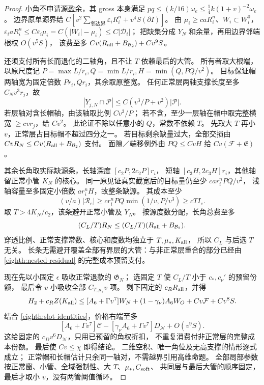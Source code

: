\begin{proof}
小角不申请源盈余，其 gross 本身满足
\(pq\le(k/16)\omega_e\le\tfrac14 k(1+v)^{-2}\omega_e\)。
边界原单源界给
\(C[v^2\sum_{\text{邻边界}}\varepsilon_iR_i^n+v^4S(\partial I)]\)。
由 \(\mu_i\ge c aR_i^n\)、\(W_i\subset W_i^0\)，
\(\varepsilon_i aR_i^n\le C\varepsilon_i\mu_i
=C(|W_i|-\mu_i)\le C|\mathscr D_i|\)；
把缺集分成 \(Y_N\) 和余量，再用边界邻端根权 \(O(v^5S)\)，
该费至多 \(Cv(R_{\rm all}+B_{\mathcal B_2})+Cv^9S\)。

还须支付所有长而退化的二轴角，且不让 \(T\) 依赖最后的大管。
所有者取大根端，以原尺度记
\(P=\max L/r_i,Q=\min L/r_i,H=\min(Q,PQ/v^2)\)。
目标保证帽两轴宽为固定倍数 \(Pr_i,Qr_i\)，其余取原整宽。
任何正常层两轴支撑长度至多 \(C_Nv^3r_j\)，故
\begin{equation}\label{eighth:long-cap-fraction}
 |Y_{j,N}\cap\mathcal P|
 \le C(v^3/P+v^2)|\mathcal P|.
\end{equation}
若层轴对含长帽轴，由该轴取比例 \(Cv^3/P\)；
若不含，至少一层轴在帽中取完整横宽 \(\ge cvr_j\)，给 \(Cv^2\)。
此论证不除以任意小的 \(Q\)，常数不依赖 \(T\)。
先取大 \(T\) 再小 \(v\)，正常层占目标帽不超过四分之一。
若目标剩余缺量过大，全部交损由
\(CvR_N\le Cv(R_{\rm all}+B_{\mathcal B_2})\) 支付。
面隙／端移例外由 \(PQ\le CvH\) 给 \(Cv(\mathcal F+\mathfrak E)\)。

其余长角取实际缺源条，长轴深度 \([c_2P,2c_2P]r_i\)，
短轴 \([c_3H,2c_3H]r_i\)，其他轴留正常小管 \(K_N\) 的核心。
同一原见证真实截宽后的目标量仍至少 \(car_i^nPQ/v^2\)，
浅轴容量至多固定小倍数 \(ar_i^nH\)，故整条缺源。
其成本至少
\[
 (v/a)|\mathcal R_e|\ge
 cr_i^nPQ\min(1/v,P/v^3)\ge cT I_e .
\]
取 \(T>4K_N/c_2\)，该条避开正常小管及 \(Y_N\)。
按源度数分配，长角总费至多
\begin{equation}\label{eighth:two-tubes}
 (C_L/T)R_N\le(C_L/T)(R_{\rm all}+B_{\mathcal B_2}).
\end{equation}
穿透比例、正常支撑常数、核心和度数均独立于 \(T,\mu_*,K_{\rm all}\)，
所以 \(C_L\) 与后选 \(T\) 无关。
长条无需避开覆盖全部有界层的大管：与非正常层重合的部分已经由
\eqref{eighth:nested-residual} 的完整成本预留支付。

现在先以小固定 \(\epsilon\) 吸收正常退款的 \(\mathfrak G_N\)；
选固定 \(T\) 使 \(C_L/T\) 小于 \(c_*,c_\nu'\) 的预留份额，
最后令 \(v\) 小吸收全部 \(C_{T,\mu_*}v\) 项。
剩下固定的 \(c_RR_{\rm all}\)，并得
\[
 H_2+c_RZ(K_{\rm all})
 \le[A_6+\Gamma v^7]W_N+(1-\gamma_\nu)A_6W_O+Cv\mathcal F+Cv^8S .
\]
结合 \eqref{eighth:slot-identities}，价格右端至多
\[
 [A_6+\Gamma v^7]\mathcal C-
       [\gamma_\nu A_6+\Gamma v^7]D_{\mathcal N}+O(v^9S).
\]
这给固定的 \(c_Dv^6D_{\mathcal N}\)，只用已预留的角权折扣，
不重复消费付非正常层的完整成本份额。
最后使 \(Cv\le\chi\) 即得结论。
二维空积、唯一角位及无高支撑的情形逐式成立；
正常帽和长帽估计只余同一轴对，不需越界引用高维命题。
全部局部参数按正常窗、小管、全域强制性、大 \(T\)、\(\mu_*,C_{\rm soft}\)、
共同层与最后大管的顺序固定，最后才取小 \(v\)，没有两管阈值循环。
\end{proof}

